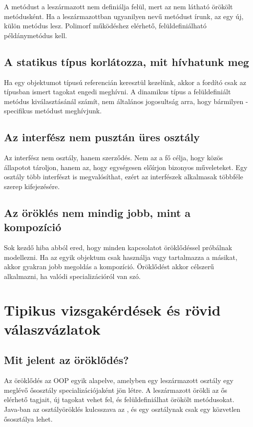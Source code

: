 A  metódust a leszármazott nem definiálja felül, mert az nem látható örökölt metódusként. Ha a leszármazottban ugyanilyen nevű metódust írunk, az egy új, külön metódus lesz. Polimorf működéshez elérhető, felüldefiniálható példánymetódus kell.

\subsection{A statikus típus korlátozza, mit hívhatunk meg}

Ha egy  objektumot  típusú referencián keresztül kezelünk, akkor a fordító csak az  típusban ismert tagokat engedi meghívni. A dinamikus típus a felüldefiniált metódus kiválasztásánál számít, nem általános jogosultság arra, hogy bármilyen -specifikus metódust meghívjunk.

\subsection{Az interfész nem pusztán üres osztály}

Az interfész nem osztály, hanem szerződés. Nem az a fő célja, hogy közös állapotot tároljon, hanem az, hogy egységesen előírjon bizonyos műveleteket. Egy osztály több interfészt is megvalósíthat, ezért az interfészek alkalmasak többféle szerep kifejezésére.

\subsection{Az öröklés nem mindig jobb, mint a kompozíció}

Sok kezdő hiba abból ered, hogy minden kapcsolatot öröklődéssel próbálnak modellezni. Ha az egyik objektum csak használja vagy tartalmazza a másikat, akkor gyakran jobb megoldás a kompozíció. Öröklődést akkor célszerű alkalmazni, ha valódi specializációról van szó.

\section{Tipikus vizsgakérdések és rövid válaszvázlatok}

\subsection{Mit jelent az öröklődés?}

Az öröklődés az OOP egyik alapelve, amelyben egy leszármazott osztály egy meglévő ősosztály specializációjaként jön létre. A leszármazott örökli az ős elérhető tagjait, új tagokat vehet fel, és felüldefiniálhat örökölt metódusokat. Java-ban az osztályöröklés kulcsszava az , és egy osztálynak csak egy közvetlen ősosztálya lehet.

